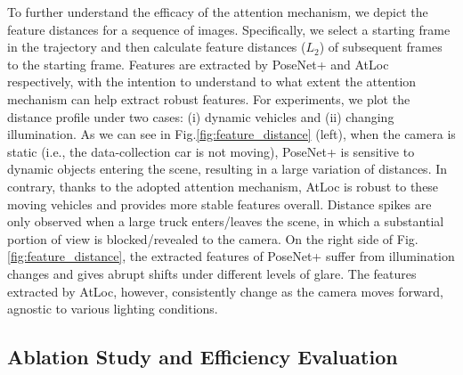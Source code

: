 \documentclass[letterpaper]{article}
\begin{document}
To further understand the efficacy of the attention mechanism, we depict the feature distances for a sequence of images. Specifically, we select a starting frame in the trajectory and then calculate feature distances ($L_2$) of subsequent frames to the starting frame. Features are extracted by PoseNet+ and AtLoc respectively, with the intention to understand to what extent the attention mechanism can help extract robust features. For experiments, we plot the distance profile under two cases: (i) dynamic vehicles and (ii) changing illumination. As we can see in Fig.\ref{fig:feature_distance} (left), when the camera is static (i.e., the data-collection car is not moving), PoseNet+ is sensitive to dynamic objects entering the scene, resulting in a large variation of distances. In contrary, thanks to the adopted attention mechanism, AtLoc is robust to these moving vehicles and provides more stable features overall. Distance spikes are only observed when a large truck enters/leaves the scene, in which a substantial portion of view is blocked/revealed to the camera.
On the right side of Fig.\ref{fig:feature_distance}, the extracted features of PoseNet+ suffer from illumination changes and gives abrupt shifts under different levels of glare. The features extracted by AtLoc, however, consistently change as the camera moves forward, agnostic to various lighting conditions.  



\subsection{Ablation Study and Efficiency Evaluation}
\end{document}
